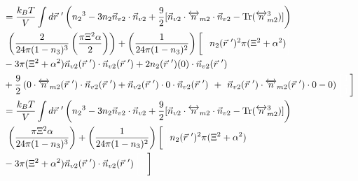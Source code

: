 \documentclass[double,12pt]{beavtex}
\begin{document}
\begin{align} %
%
&=\frac{k_BT}{V}\int d\vec r~' \left( {n_2}^3-3n_2
    \vec{n}_{v2}\cdot\vec{n}_{v2} 
     +\frac{9}{2}[\vec{n}_{v2}\cdot{\overleftrightarrow{n}_{m2}}\cdot{
     \vec{n}_{v2}}-\operatorname{Tr}({\overleftrightarrow{n}^3_{m2}})]
     \right) \nonumber\\
     &~\left(\frac{2}{24\pi(1-n_3)^3}\left(\frac{\pi\Xi^2\alpha}{2}\right)
     \right) + \left(\frac{1}{24\pi(1-n_3)^2}\right)\left[\color{white}
     \frac{1}{1}\color{black}n_2(\vec r~')^2
     \pi(\Xi^2 + \alpha^2) \color{white}\right] \nonumber\\
     &- 3\pi(\Xi^2 + \alpha^2)\vec n_{v2}(\vec r~') \cdot \vec n_{v2}
     (\vec r~') + 2n_2(\vec r~')(0)\cdot \vec n_{v2}(\vec r~')\nonumber \\
     &+\frac{9}{2}\left(0\cdot \overleftrightarrow n_{m2}(\vec r~')\cdot 
     \vec n_{v2}( \vec r~')+\vec n_{v2}(\vec r~')\cdot 0 \cdot \vec n_{v2}
     (\vec r~')\color{white}\right)+ \color{white}\left(\color{black}
     \vec n_{v2}(\vec r~')\cdot\overleftrightarrow n_{m2}(\vec r~')
     \cdot 0-0\right) 
     \color{white}\left[\frac{1}{1}\color{black}\right] \\
%
&=\frac{k_BT}{V}\int d\vec r~' \left({n_2}^3-3n_2
   \vec{n}_{v2}\cdot\vec{n}_{v2} 
    +\frac{9}{2}[\vec{n}_{v2}\cdot{\overleftrightarrow{n}_{m2}}\cdot{
    \vec{n}_{v2}}-\operatorname{Tr}({\overleftrightarrow{n}^3_{m2}})]
    \right) \nonumber\\
    &~\left(\frac{\pi\Xi^2\alpha}{24\pi(1-n_3)^3}
    \right) + \left(\frac{1}{24\pi(1-n_3)^2}\right)\left[\color{white}
    \frac{1}{1}\color{black}n_2(\vec r~')^2
    \pi(\Xi^2 + \alpha^2) \color{white}\right] \\
    &- 3\pi(\Xi^2 + \alpha^2)\vec n_{v2}
    (\vec r~') \cdot \vec n_{v2}(\vec r~')
    \color{white}\left[\frac{1}{1}\color{black}\right]
\end{align}
\end{document}
